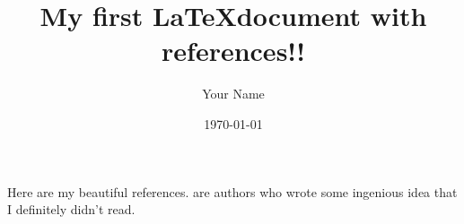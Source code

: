 \documentclass[]{article}
\begin{document}
\title{My first \LaTeX document with references!!}
\author{Your Name}
\date{\today}

\maketitle

Here are my beautiful references. \citet{odonnell_analyzing_2007} are authors who wrote some ingenious idea \citep{odonnell_analyzing_2007} that I definitely didn't read.


\end{document}
